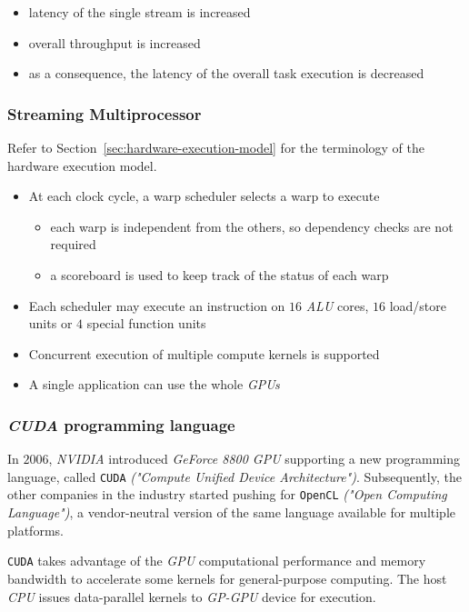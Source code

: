 \documentclass[english]{article}
\begin{document}
\begin{itemize}
  \item latency of the single stream is increased
  \item overall throughput is increased
  \item as a consequence, the latency of the overall task execution is decreased
\end{itemize}

\subsubsection{Streaming Multiprocessor}

Refer to Section~\ref{sec:hardware-execution-model} for the terminology of the hardware execution model.

\begin{itemize}
  \item At each clock cycle, a warp scheduler selects a warp to execute
        \begin{itemize}
          \item each warp is independent from the others, so dependency checks are not required
          \item a scoreboard is used to keep track of the status of each warp
        \end{itemize}
  \item Each scheduler may execute an instruction on \(16\) \textit{ALU} cores, \(16\) load/store units or \(4\) special function units
  \item Concurrent execution of multiple compute kernels is supported
  \item A single application can use the whole \textit{GPUs}
\end{itemize}

\subsubsection{\textit{CUDA} programming language}

In \(2006\), \textit{NVIDIA} introduced \textit{GeForce 8800 GPU} supporting a new programming language, called \texttt{CUDA} \textit{("Compute Unified Device Architecture")}.
Subsequently, the other companies in the industry started pushing for \texttt{OpenCL} \textit{("Open Computing Language")}, a vendor-neutral version of the same language available for multiple platforms.

\texttt{CUDA} takes advantage of the \textit{GPU} computational performance and memory bandwidth to accelerate some kernels for general-purpose computing.
The host \textit{CPU} issues data-parallel kernels to \textit{GP-GPU} device for execution.
\end{document}
